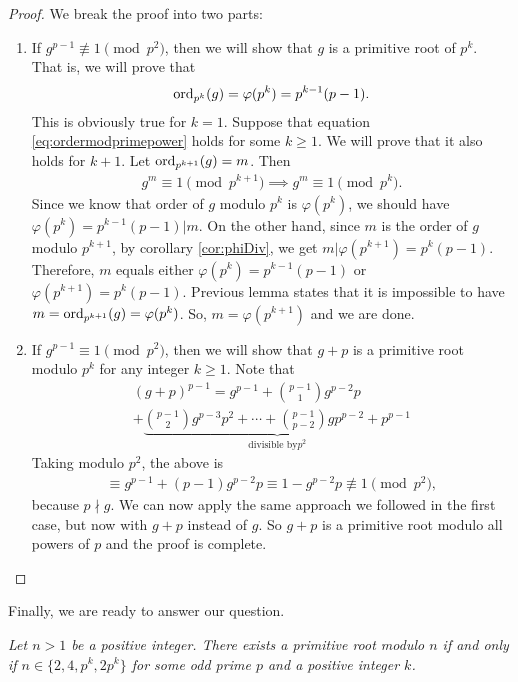 \documentclass{subfile}
\begin{document}
	\begin{proof}
		We break the proof into two parts:
		\begin{enumerate}
			\item If $g^{p-1} \not \equiv 1 \pmod{p^2}$, then we will show that $g$ is a primitive root of $p^k$. That is, we will prove that
				\begin{align}\label{eq:ordermodprimepower}
					\operatorname{ord}_{p^k} (g)=\varphi(p^k)=p^{k-1}(p-1).
				\end{align}
			This is obviously true for $k=1$. Suppose that equation \eqref{eq:ordermodprimepower} holds for some $k\geq 1$. We will prove that it also holds for $k+1$. Let $\operatorname{ord}_{p^{k+1}} (g)=m$. Then
				\begin{align*}
					g^m \equiv 1 \pmod{p^{k+1}} \implies g^m \equiv 1 \pmod{p^{k}}.
				\end{align*}
			Since we know that order of $g$ modulo $p^k$ is $\varphi(p^k)$, we should have $\varphi(p^k)=p^{k-1}(p-1)|m$. On the other hand, since $m$ is the order of $g$ modulo $p^{k+1}$, by corollary \eqref{cor:phiDiv}, we get $m|\varphi(p^{k+1})=p^k(p-1)$. Therefore, $m$ equals either $\varphi(p^k)=p^{k-1}(p-1)$ or $\varphi(p^{k+1})=p^{k}(p-1)$. Previous lemma states that it is impossible to have $m=\operatorname{ord}_{p^{k+1}} (g)=\varphi(p^k)$. So, $m=\varphi(p^{k+1})$ and we are done.
			
			\item If $g^{p-1} \equiv 1 \pmod{p^2}$, then we will show that $g+p$ is a primitive root modulo $p^k$ for any integer $k\geq 1$. Note that
				\begin{multline*}
					(g+p)^{p-1} = g^{p-1} + \binom{p-1}{1} g^{p-2}p \\ + \underbrace{\binom{p-1}{2}g^{p-3}p^2+\cdots + \binom{p-1}{p-2} gp^{p-2} + p^{p-1}}_{\mbox{divisible by} p^2}
				\end{multline*}
			Taking modulo $p^2$, the above is
				\begin{align*}
					\equiv g^{p-1}+(p-1)g^{p-2}p \equiv 1 - g^{p-2}p \not \equiv 1 \pmod{p^2},
				\end{align*}
			because $p \nmid g$. We can now apply the same approach we followed in the first case, but now with $g+p$ instead of $g$. So $g+p$ is a primitive root modulo all powers of $p$ and the proof is complete.
		\end{enumerate}
	\end{proof}

Finally, we are ready to answer our question.

	\begin{theorem}\slshape
		Let $n>1$ be a positive integer. There exists a primitive root modulo $n$ if and only if $n\in\{2,4,p^k,2p^k\}$ for some odd prime $p$ and a positive integer $k$.
		\label{thm:pr:wh} 
	\end{theorem}
	
\end{document}
